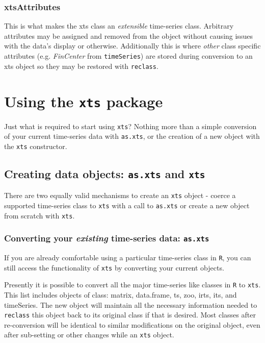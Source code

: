 \documentclass{article}
\begin{document}
\subsubsection*{xtsAttributes}
This is what makes the xts class an \emph{extensible}
time-series class. Arbitrary attributes may be assigned
and removed from the object without causing issues with the data's display or
otherwise.  Additionally this is where \emph{other}
class specific attributes (e.g. \emph{FinCenter} from {\tt timeSeries})
are stored during conversion
to an xts object so they may be restored with {\tt reclass}.

\pagebreak
\section{Using the {\tt xts} package}
Just what is required to start using {\tt xts}?  Nothing more
than a simple conversion of your current time-series data with
{\tt as.xts}, or the creation of a new object with the {\tt xts} constructor.

\subsection{Creating data objects: {\tt as.xts} and {\tt xts}}
There are two equally valid mechanisms to create an {\tt xts}
object - coerce a supported time-series class to {\tt xts} with
a call to {\tt as.xts} or create a new object from scratch
with {\tt xts}.

\subsubsection*{Converting your \emph{existing} time-series data: {\tt as.xts}}
If you are already comfortable using a particular
time-series class in {\tt R}, you can still access
the functionality of {\tt xts} by converting your
current objects.

Presently it is possible to convert all the major
time-series like classes in {\tt R} to {\tt xts}. This list
includes objects of class:
matrix, data.frame, ts, zoo, irts, its, and timeSeries.
The new object will maintain all the necessary information
needed to {\tt reclass} this object back to its
original class if that is desired. Most classes
after re-conversion will be identical to similar modifications
on the original object, even
after sub-setting or other changes while an {\tt xts} object.
\end{document}
